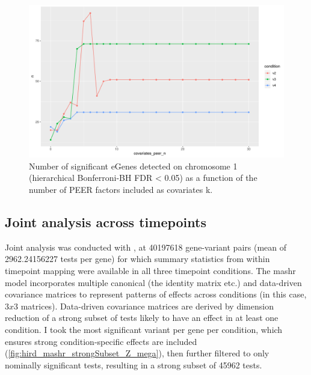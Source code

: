 \begin{figure}
    \centering
    \includegraphics[width=1.0\textwidth,page=1]{mainmatter/figures/chapter_03/count_eGenes.signif_eGenes_vs_PEER_n.dataset_mega.chr_chr1.pdf}
    \caption{Number of significant eGenes detected on chromosome 1 (hierarchical Bonferroni-\gls{BH} FDR < 0.05) as a function of the number of PEER factors included as covariates k.}
    \label{fig:hird_neGenesvsPeerK}
\end{figure}

\subsection{Joint  analysis across timepoints}

Joint analysis was conducted with \autocite{urbut2018FlexibleStatisticalMethods}, at 40197618 gene-variant pairs (mean of \num[round-mode=places,round-precision=0]{2962.24156227} tests per gene) for which summary statistics from within timepoint mapping were available in all three timepoint conditions.
The mashr model incorporates multiple canonical (the identity matrix etc.) and data-driven covariance matrices to represent patterns of effects across conditions (in this case, $3 x 3$ matrices).
Data-driven covariance matrices are derived by dimension reduction of a strong subset of tests likely to have an effect in at least one condition.
I took the most significant variant per gene per condition, 
which ensures strong condition-specific effects are included (\autoref{fig:hird_mashr_strongSubset_Z_mega}), 
then further filtered to only nominally significant tests, resulting in a strong subset of 45962 tests.

